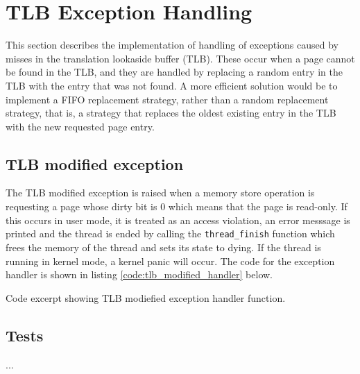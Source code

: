 %
%
%

\section{TLB Exception Handling}
This section describes the implementation of handling of exceptions caused by
misses in the translation lookaside buffer (TLB). These occur when a page cannot
be found in the TLB, and they are handled by replacing a random entry in the TLB
with the entry that was not found. A more efficient solution would be to
implement a FIFO replacement strategy, rather than a random replacement
strategy, that is, a strategy that replaces the oldest existing entry in
the TLB with the new requested page entry.


\subsection{TLB modified exception}
The TLB modified exception is raised when a memory store operation is requesting
a page whose dirty bit is 0 which means that the page is read-only. If this
occurs in user mode, it is treated as an access violation, an error messsage is
printed and the thread is ended by calling the \verb|thread_finish| function
which frees the memory of the thread and sets its state to dying. If the
thread is running in kernel mode, a kernel panic will occur. The code for the
exception handler is shown in listing \ref{code:tlb_modified_handler} below.

{Code excerpt showing TLB modiefied exception handler function.}


\subsection{Tests}
...
